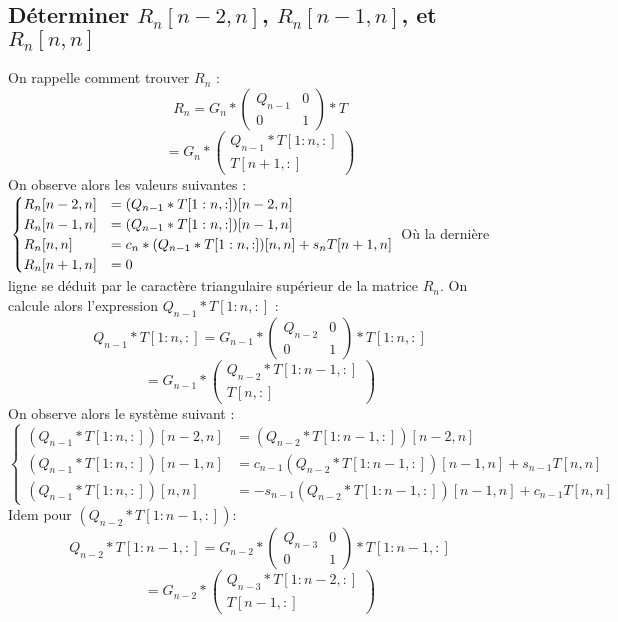 \documentclass[12 pt]{article}
\begin{document}
\subsection*{Déterminer $R_n[n-2,n]$, $R_n[n-1,n]$, et $R_n[n,n]$}

On rappelle comment trouver $R_n$ :
\[ R_n = G_n*\begin{pmatrix} Q_{n-1} & 0 \\ 0 & 1 \end{pmatrix}*T \] 
\[  = G_n*\begin{pmatrix} Q_{n-1}*T[1:n,:] \\ T[n+1,:] \end{pmatrix} \]
On observe alors les valeurs suivantes : 
$ \\
\begin{cases}
  R_n[n-2,n] &= (Q_{n-1}*T[1:n,:])[n-2,n]  \\
  R_n[n-1,n] &= (Q_{n-1}*T[1:n,:])[n-1,n]  \\
  R_n[n,n] &= c_n*(Q_{n-1}*T[1:n,:])[n,n] + s_nT[n+1,n]  \\
  R_n[n+1,n] &= 0 
\end{cases} \\ $
Où la dernière ligne se déduit par le caractère triangulaire supérieur de la matrice $R_n$. On calcule alors l'expression $Q_{n-1}*T[1:n,:]$ :
\[ Q_{n-1}*T[1:n,:] = G_{n-1}*\begin{pmatrix} Q_{n-2} & 0 \\ 0 & 1 \end{pmatrix}*T[1:n,:] \] 
\[  = G_{n-1}*\begin{pmatrix} Q_{n-2}*T[1:n-1,:] \\ T[n,:] \end{pmatrix} \]
On observe alors le système suivant : $
\begin{cases} 
  (Q_{n-1}*T[1:n,:])[n-2,n] &= (Q_{n-2}*T[1:n-1,:])[n-2,n] \\
  (Q_{n-1}*T[1:n,:])[n-1,n] &= c_{n-1}(Q_{n-2}*T[1:n-1,:])[n-1,n] + s_{n-1}T[n,n] \\
  (Q_{n-1}*T[1:n,:])[n,n] &=  -s_{n-1}(Q_{n-2}*T[1:n-1,:])[n-1,n] +c_{n-1}T[n,n] 
\end{cases}$
Idem pour $(Q_{n-2}*T[1:n-1,:])$:
\[ Q_{n-2}*T[1:n-1,:] = G_{n-2}*\begin{pmatrix} Q_{n-3} & 0 \\ 0 & 1 \end{pmatrix}*T[1:n-1,:] \] 
\[  = G_{n-2}*\begin{pmatrix} Q_{n-3}*T[1:n-2,:] \\ T[n-1,:] \end{pmatrix} \]
\end{document}
